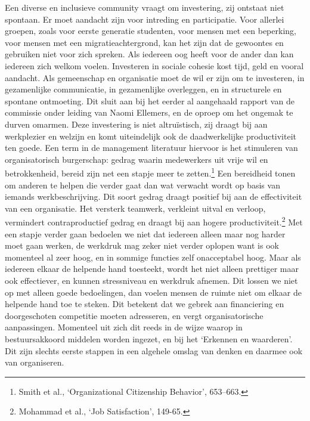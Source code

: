 \documentclass[smallauthor, chapterhaspagenum, nochapterinheader, pagenuminheader,  bigchapnum,medium2, tocpages, garamond, titleinheader]{jote-book}
\begin{document}
	Een diverse en inclusieve community vraagt om investering, zij ontstaat niet spontaan. Er moet aandacht zijn voor intreding en participatie. Voor allerlei groepen, zoals voor eerste generatie studenten, voor mensen met een beperking, voor mensen met een migratieachtergrond, kan het zijn dat de gewoontes en gebruiken niet voor zich spreken. Als iedereen oog heeft voor de ander dan kan iedereen zich welkom voelen. Investeren in sociale cohesie kost tijd, geld en vooral aandacht. Als gemeenschap en organisatie moet de wil er zijn om te investeren, in gezamenlijke communicatie, in gezamenlijke overleggen, en in structurele en spontane ontmoeting. Dit sluit aan bij het eerder al aangehaald rapport van de commissie onder leiding van Naomi Ellemers, en de oproep om het ongemak te durven omarmen. Deze investering is niet altruïstisch, zij draagt bij aan werkplezier en welzijn en komt uiteindelijk ook de daadwerkelijke productiviteit ten goede. Een term in de management literatuur hiervoor is het stimuleren van organisatorisch burgerschap: gedrag waarin medewerkers uit vrije wil en betrokkenheid, bereid zijn net een stapje meer te zetten.\footnote{Smith et al., ‘Organizational Citizenship Behavior', 653--663.} Een bereidheid tonen om anderen te helpen die verder gaat dan wat verwacht wordt op basis van iemands werkbeschrijving. Dit soort gedrag draagt positief bij aan de effectiviteit van een organisatie. Het versterk teamwerk, verkleint uitval en verloop, vermindert contraproductief gedrag en draagt bij aan hogere productiviteit.\footnote{Mohammad et al., ‘Job Satisfaction', 149-65.} Met een stapje verder gaan bedoelen we niet dat iedereen alleen maar nog harder moet gaan werken, de werkdruk mag zeker niet verder oplopen want is ook momenteel al zeer hoog, en in sommige functies zelf onacceptabel hoog. Maar als iedereen elkaar de helpende hand toesteekt, wordt het niet alleen prettiger maar ook effectiever, en kunnen stressniveau en werkdruk afnemen. Dit lossen we niet op met alleen goede bedoelingen, dan voelen mensen de ruimte niet om elkaar de helpende hand toe te steken. Dit betekent dat we gebrek aan financiering en doorgeschoten competitie moeten adresseren, en vergt organisatorische aanpassingen. Momenteel uit zich dit reeds in de wijze waarop in bestuursakkoord middelen worden ingezet, en bij het ‘Erkennen en waarderen'. Dit zijn slechts eerste stappen in een algehele omslag van denken en daarmee ook van organiseren.
\end{document}

